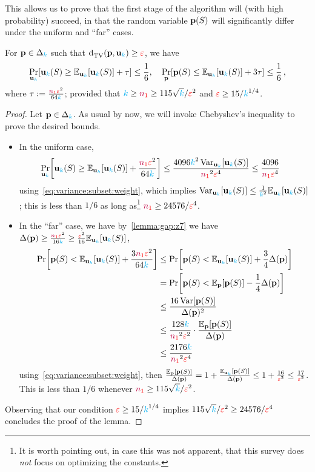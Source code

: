 This allows us to prove that the first stage of the algorithm will (with high probability) succeed, in that the random variable $\mathbf{p}(S)$ will significantly differ under the uniform and ``far'' cases. 
\begin{lemma}
  \label{lemma:empirical:subset:guarantee:pS}
  For $\mathbf{p}\in\Delta_{{\textcolor{cyan}{k}}}$ such that $\totalvardist{\p}{\uniform_\ab} \geq \dst$, we have
  \[
  \bP{\uniform_\ab}{\uniform_\ab(S) \geq \bE{\uniform_\ab}{\uniform_\ab(S)} + \tau} \leq \frac{1}{6}
  , \quad
  \bP{\p}{\p(S) \leq \bE{\uniform_\ab}{\uniform_\ab(S)} + 3\tau} \leq \frac{1}{6}\,,
  \]
  where $\tau := \frac{\textcolor{red}{{\textcolor{purple}{n}}_1}\textcolor{red}{\varepsilon}^2}{64{\textcolor{cyan}{k}}}$; provided that ${\textcolor{cyan}{k}} \geq \textcolor{red}{{\textcolor{purple}{n}}_1} \geq 115\sqrt{{\textcolor{cyan}{k}}}/\textcolor{red}{\varepsilon}^2$ and $\textcolor{red}{\varepsilon} \geq 15/{\textcolor{cyan}{k}}^{1/4}$.
\end{lemma}
\begin{proof}
Let $\mathbf{p}\in\Delta_{{\textcolor{cyan}{k}}}$. As usual by now, we will invoke Chebyshev's inequality to prove the desired bounds.
\begin{itemize}
    \item In the uniform case, 
    \begin{align*}
    \bP{\uniform_\ab}{\uniform_\ab(S) \geq \bE{\uniform_\ab}{\uniform_\ab(S)} + \frac{\nss\dst^2}{64\ab}} 
    &\leq \frac{4096\ab^2\Var_{\uniform_\ab}[\uniform_\ab(S)]}{\nss^2\dst^4} 
    \leq \frac{4096}{\nss\dst^4}
    \end{align*}
    using~\cref{eq:variance:subset:weight}, which implies $\Var_{\uniform_\ab}[\uniform_\ab(S)] \leq \frac{1}{\ab^2}\bE{\uniform_\ab}{\uniform_\ab(S)}$; this is less than $1/6$ as long as\footnote{It is worth pointing out, in case this was not apparent, that this survey does \emph{not} focus on optimizing the constants.} $\textcolor{red}{{\textcolor{purple}{n}}_1} \geq 24576/\textcolor{red}{\varepsilon}^4$.
    \item In the ``far'' case, we have by~\cref{lemma:gap:z7} we have $\Delta(\p) \geq \frac{\nss\dst^2}{16\ab} \geq \frac{\dst^2}{16}\bE{\uniform_\ab}{\uniform_\ab(S)}$, 
    \begin{align*}
        \bPr{\p(S) < \bE{\uniform_\ab}{\uniform_\ab(S)} + \frac{3\nss\dst^2}{64\ab}} 
        &\leq \bPr{\p(S) < \bE{\uniform_\ab}{\uniform_\ab(S)} + \frac{3}{4}\Delta(\p)}\\
        &= \bPr{\p(S) < \bE{\p}{\p(S)} - \frac{1}{4}\Delta(\p)} \\
        &\leq \frac{16\Var[\p(S)]}{\Delta(\p)^2} \\
        &\leq \frac{128\ab}{\nss^2\dst^2}\cdot \frac{\bE{\p}{\p(S)}}{\Delta(\p)} \\
        &\leq \frac{2176\ab}{\nss^2\dst^4} 
    \end{align*}
    using~\cref{eq:variance:subset:weight}, then $\frac{\bE{\p}{\p(S)}}{\Delta(\p)} = 1+\frac{\bE{\uniform_\ab}{\p(S)}}{\Delta(\p)} \leq 1+\frac{16}{\dst^2} \leq \frac{17}{\dst^2}$. This is less than $1/6$ whenever $\textcolor{red}{{\textcolor{purple}{n}}_1} \geq 115\sqrt{{\textcolor{cyan}{k}}}/\textcolor{red}{\varepsilon}^2$.
\end{itemize}
Observing that our condition $\textcolor{red}{\varepsilon} \geq 15/{\textcolor{cyan}{k}}^{1/4}$ implies $115\sqrt{{\textcolor{cyan}{k}}}/\textcolor{red}{\varepsilon}^2\geq 24576/\textcolor{red}{\varepsilon}^4$ concludes the proof of the lemma.
\end{proof}


